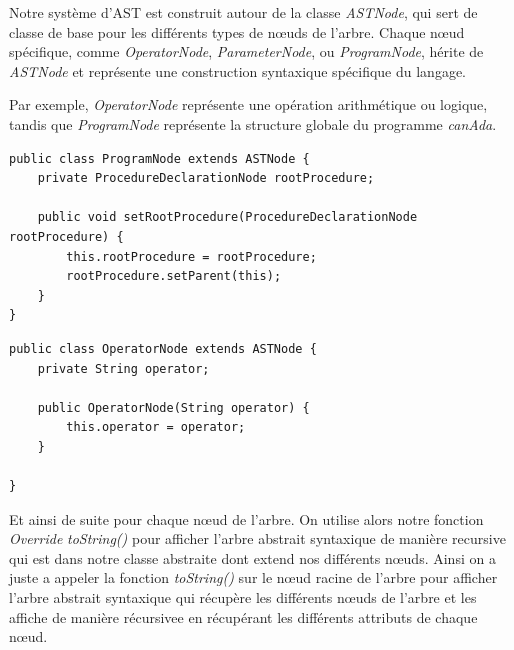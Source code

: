 \documentclass[french,a4paper]{article}
\begin{document}
    Notre système d'AST est construit autour de la classe \textit{ASTNode}, qui sert de classe de base pour les différents types de nœuds de l'arbre.
    Chaque nœud spécifique, comme \textit{OperatorNode}, \textit{ParameterNode}, ou \textit{ProgramNode}, hérite de \textit{ASTNode} et représente une construction syntaxique spécifique du langage.

    Par exemple, \textit{OperatorNode} représente une opération arithmétique ou logique, tandis que \textit{ProgramNode} représente la structure globale du programme \textit{canAda}.

    \begin{lstlisting}[label={lst:lstlisting13}]
public class ProgramNode extends ASTNode {
    private ProcedureDeclarationNode rootProcedure;

    public void setRootProcedure(ProcedureDeclarationNode rootProcedure) {
        this.rootProcedure = rootProcedure;
        rootProcedure.setParent(this);
    }
}
    \end{lstlisting}

    \begin{lstlisting}[label={lst:lstlisting15}]
public class OperatorNode extends ASTNode {
    private String operator;

    public OperatorNode(String operator) {
        this.operator = operator;
    }

}
    \end{lstlisting}

    Et ainsi de suite pour chaque nœud de l'arbre.
    On utilise alors notre fonction \textit{Override} \textit{toString()} pour afficher l'arbre abstrait syntaxique de manière recursive qui est dans notre classe abstraite dont extend nos différents nœuds.
    Ainsi on a juste a appeler la fonction \textit{toString()} sur le nœud racine de l'arbre pour afficher l'arbre abstrait syntaxique qui récupère les différents nœuds de l'arbre et les affiche de manière récursivee en récupérant les différents attributs de chaque nœud.
\end{document}
